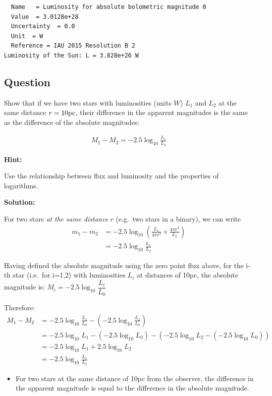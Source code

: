 \documentclass[
  letterpaper,
  DIV=11,
  numbers=noendperiod]{scrreprt}
\providecommand{\tightlist}{%
  \setlength{\itemsep}{0pt}\setlength{\parskip}{0pt}}\usepackage{longtable,booktabs,array}
\begin{document}
\begin{verbatim}
  Name   = Luminosity for absolute bolometric magnitude 0
  Value  = 3.0128e+28
  Uncertainty  = 0.0
  Unit  = W
  Reference = IAU 2015 Resolution B 2
Luminosity of the Sun: L = 3.828e+26 W
\end{verbatim}

\hypertarget{question-2}{%
\subsection{Question}\label{question-2}}

Show that if we have two stars with luminosities (units \(W\)) \(L_1\)
and \(L_2\) at the same distance \(r=10\rm{pc}\), their difference in
the apparent magnitudes is the same as the difference of the absolute
magnitudes:

\begin{align}
M_1 - M_2 = -2.5 \log_{10} \frac{L_1}{L_2}
\end{align}

\textbf{Hint:}

Use the relationship between flux and luminosity and the properties of
logarithms.

\textbf{Solution:}

For two stars \emph{at the same distance} \(r\) (e.g.~two stars in a
binary), we can write \begin{align}
m_1 - m_2 &= -2.5\log_{10}\left(\frac{L_1}{4\pi r^2} \times \frac{4\pi r^2}{L_2} \right)\\
&= -2.5\log_{10}\frac{L_1}{L_2}
\end{align}

Having defined the absolute magnitude using the zero point flux above,
for the i-th star (i.e.~for i=1,2) with luminosities \(L_i\) at
distances of 10pc, the absolute magnitude is:
\(M_i = -2.5 \log_{10}{\dfrac{L_i}{L_0}}\)

Therefore: \begin{align*}
M_1 - M_2 & = -2.5 \log_{10}{\frac{L_1}{L_0}} - \left(-2.5 \log_{10}{\frac{L_2}{L_0}}\right) \\
& = -2.5\log_{10} L_1 - ( -2.5\log_{10} L_0) - ( -2.5\log_{10} L_2 - ( -2.5\log_{10} L_0)) \\
& = -2.5 \log_{10} L_1 + 2.5 \log_{10} L_2\\
& = -2.5 \log_{10}{\frac{L_1}{L_2}}
\end{align*}

\begin{itemize}
\tightlist
\item
  For two stars at the same distance of 10pc from the observer, the
  difference in the apparent magnitude is equal to the difference in the
  absolute magnitude.
\end{itemize}
\end{document}
